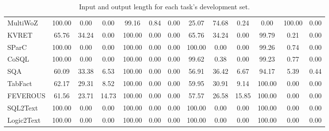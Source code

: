 \documentclass[11pt]{article}
\begin{document}
\begin{table*}[ht]
\begin{adjustbox}{width=\textwidth}
\begin{tabular}{@{}lcccccccccccc@{}}
    MultiWoZ  & 100.00 & 0.00 & 0.00 & 99.16 & 0.84 & 0.00 & 25.07 & 74.68 & 0.24 & 0.00 & 100.00 & 0.00 \\
    KVRET  & 65.76 & 34.24 & 0.00 & 100.00 & 0.00 & 0.00 & 65.76 & 34.24 & 0.00 & 99.79 & 0.21 & 0.00 \\
    SParC  & 100.00 & 0.00 & 0.00 & 100.00 & 0.00 & 0.00 & 100.00 & 0.00 & 0.00 & 99.26 & 0.74 & 0.00 \\
    CoSQL  & 100.00 & 0.00 & 0.00 & 100.00 & 0.00 & 0.00 & 99.62 & 0.38 & 0.00 & 99.23 & 0.77 & 0.00 \\
    SQA  & 60.09 & 33.38 & 6.53 & 100.00 & 0.00 & 0.00 & 56.91 & 36.42 & 6.67 & 94.17 & 5.39 & 0.44 \\
    TabFact  & 62.17 & 29.31 & 8.52 & 100.00 & 0.00 & 0.00 & 59.95 & 30.91 & 9.14 & 100.00 & 0.00 & 0.00\\
    FEVEROUS & 61.56 & 23.71 & 14.73 & 100.00 & 0.00 & 0.00 & 57.57 & 26.58 & 15.85 & 100.00 & 0.00 & 0.00 \\
    SQL2Text & 100.00 & 0.00 & 0.00 & 100.00 & 0.00 & 0.00 & 100.00 & 0.00 & 0.00 & 100.00 & 0.00 & 0.00\\
    Logic2Text & 100.00 & 0.00 & 0.00 & 100.00 & 0.00 & 0.00 & 100.00 & 0.00 & 0.00 & 100.00 & 0.00 & 0.00 \\
    \bottomrule
    \end{tabular}
    \end{adjustbox}
	\caption{Input and output length for each task's development set.}
	\label{tab:length_distribution_dev}
\end{table*}
\end{document}
